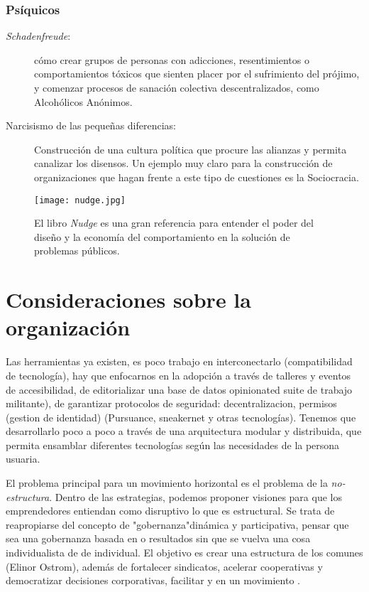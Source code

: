 \subsubsection{Psíquicos}
\label{subs:psiquicos}

\begin{description}
	\item[\emph{Schadenfreude}:] cómo crear grupos de personas con adicciones, resentimientos o comportamientos tóxicos que sienten placer por el sufrimiento del prójimo, y comenzar procesos de sanación colectiva descentralizados, como Alcohólicos Anónimos.

	\item[Narcisismo de las pequeñas diferencias:] Construcción de una cultura política que procure las alianzas y permita canalizar los disensos. Un ejemplo muy claro para la construcción de organizaciones que hagan frente a este tipo de cuestiones es la Sociocracia.
\end{description}

\begin{figure}[htbp]
	\centering
	\texttt{[image: nudge.jpg]}
	\caption[\emph{Nudge}]{El libro \emph{Nudge} es una gran referencia para entender el poder del diseño y la economía del comportamiento en la solución de problemas públicos.}
	\label{fig:nudge}
\end{figure}

\section{Consideraciones sobre la organización}
\label{sec:considerorga}

Las herramientas ya existen, es poco trabajo en interconectarlo (compatibilidad de tecnología), hay que enfocarnos en la adopción a través de talleres y eventos de accesibilidad, de editorializar una base de datos opinionated suite de trabajo militante), de garantizar protocolos de seguridad: decentralizacion, permisos (gestion de identidad) (Pursuance, sneakernet y otras tecnologías). Tenemos que desarrollarlo poco a poco a través de una arquitectura modular y distribuida, que permita ensamblar diferentes tecnologías según las necesidades de la persona usuaria.

El problema principal para un movimiento horizontal es el problema de la \emph{no-estructura}.\revquotes{} Dentro de las estrategias, podemos proponer visiones para que los emprendedores entiendan como disruptivo lo que es estructural. Se trata de reapropiarse del concepto de "gobernanza"dinámica y participativa, pensar que sea una gobernanza basada en  o resultados sin que se vuelva una cosa individualista de  de  individual. El objetivo es crear una estructura de los comunes (Elinor Ostrom), además de fortalecer sindicatos, acelerar cooperativas y democratizar decisiones corporativas, facilitar  y  en un movimiento .


